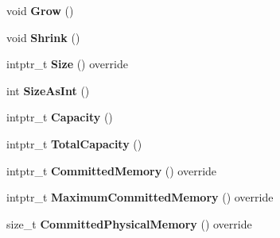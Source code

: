\begin{DoxyCompactItemize}
\item 
void {\bfseries Grow} ()\hypertarget{classv8_1_1internal_1_1_new_space_ab3f396ae74206828b53672f496b676b3}{}\label{classv8_1_1internal_1_1_new_space_ab3f396ae74206828b53672f496b676b3}

\item 
void {\bfseries Shrink} ()\hypertarget{classv8_1_1internal_1_1_new_space_a96e448968f2591e48f8f8452cbd01d72}{}\label{classv8_1_1internal_1_1_new_space_a96e448968f2591e48f8f8452cbd01d72}

\item 
intptr\+\_\+t {\bfseries Size} () override\hypertarget{classv8_1_1internal_1_1_new_space_a581f4c29593b2f469a9fb82f63bf059b}{}\label{classv8_1_1internal_1_1_new_space_a581f4c29593b2f469a9fb82f63bf059b}

\item 
int {\bfseries Size\+As\+Int} ()\hypertarget{classv8_1_1internal_1_1_new_space_af67b47d7b604b691cf5edcd42b4cac67}{}\label{classv8_1_1internal_1_1_new_space_af67b47d7b604b691cf5edcd42b4cac67}

\item 
intptr\+\_\+t {\bfseries Capacity} ()\hypertarget{classv8_1_1internal_1_1_new_space_a31fc242c1d16db736c1d274b811e1433}{}\label{classv8_1_1internal_1_1_new_space_a31fc242c1d16db736c1d274b811e1433}

\item 
intptr\+\_\+t {\bfseries Total\+Capacity} ()\hypertarget{classv8_1_1internal_1_1_new_space_ac4bedb0b77914be33285e33f2aba96c2}{}\label{classv8_1_1internal_1_1_new_space_ac4bedb0b77914be33285e33f2aba96c2}

\item 
intptr\+\_\+t {\bfseries Committed\+Memory} () override\hypertarget{classv8_1_1internal_1_1_new_space_a24c60aeee275671c042121ae9baaff78}{}\label{classv8_1_1internal_1_1_new_space_a24c60aeee275671c042121ae9baaff78}

\item 
intptr\+\_\+t {\bfseries Maximum\+Committed\+Memory} () override\hypertarget{classv8_1_1internal_1_1_new_space_a48ab1902d44a3f5a127d04743fb01fe1}{}\label{classv8_1_1internal_1_1_new_space_a48ab1902d44a3f5a127d04743fb01fe1}

\item 
size\+\_\+t {\bfseries Committed\+Physical\+Memory} () override\hypertarget{classv8_1_1internal_1_1_new_space_a384eb2dd170ca3a4d36b01ffd6da2518}{}\label{classv8_1_1internal_1_1_new_space_a384eb2dd170ca3a4d36b01ffd6da2518}


\end{DoxyCompactItemize}
